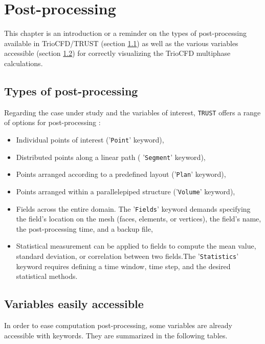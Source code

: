 \chapter{Post-processing}
\label{sec:postprocessing}
This chapter is an introduction or a reminder on the types of post-processing available in TrioCFD/TRUST (section \ref{post:type}) as well as the various variables accessible (section \ref{post:variables}) for correctly visualizing the TrioCFD multiphase calculations.
\section{Types of post-processing}\label{post:type}
Regarding the case under study and the variables of interest, \texttt{TRUST} offers a range of options for post-processing :
\begin{itemize}
      \item[\small \textcolor{blue}{\ding{109}}] Individual points of interest ('\texttt{Point}' keyword),
      \item[\small \textcolor{blue}{\ding{109}}] Distributed points along a linear path ( '\texttt{Segment}' keyword),
      \item[\small \textcolor{blue}{\ding{109}}] Points arranged according to a predefined layout ('\texttt{Plan}' keyword),
      \item[\small \textcolor{blue}{\ding{109}}] Points arranged within a parallelepiped structure ('\texttt{Volume}' keyword),
       \item[\small \textcolor{blue}{\ding{109}}] Fields across the entire domain. The '\texttt{Fields}' keyword demands specifying the field's location on the mesh (faces, elements, or vertices), the field's name, the post-processing time, and a backup file,
       \item[\small \textcolor{blue}{\ding{109}}] Statistical measurement can be applied to fields to compute the mean value, standard deviation, or correlation between two fields.The '\texttt{Statistics}' keyword requires defining a time window, time step, and the desired statistical methods.
\end{itemize}

\section{Variables easily accessible}\label{post:variables}
In order to ease computation post-processing, some variables are already accessible with keywords. They are summarized in the following tables.

